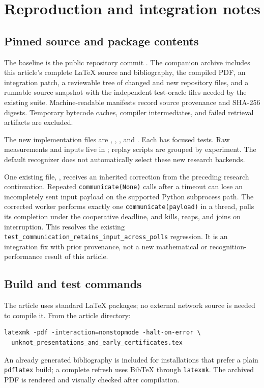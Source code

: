 \section{Reproduction and integration notes}
\label{sec:reproduce}

\subsection{Pinned source and package contents}

The baseline is the public repository commit \basecommit. The companion
archive includes this article's complete \LaTeX{} source and bibliography,
the compiled PDF, an integration patch, a reviewable tree of changed and
new repository files, and a runnable source snapshot with the independent
test-oracle files needed by the existing suite. Machine-readable manifests
record source provenance and SHA-256 digests. Temporary bytecode caches,
compiler intermediates, and failed retrieval artifacts are excluded.

The new implementation files are
, ,
, and
. Each has focused tests.
Raw measurements and inputs live in ; replay
scripts are grouped by experiment. The default recognizer does not
automatically select these new research backends.

One existing file, , receives an
inherited correction from the preceding research continuation. Repeated
\texttt{communicate(None)} calls after a timeout can lose an incompletely
sent input payload on the supported Python subprocess path. The corrected
worker performs exactly one \texttt{communicate(payload)} in a thread,
polls its completion under the cooperative deadline, and kills, reaps,
and joins on interruption. This resolves the existing
\texttt{test\_communication\_retains\_input\_across\_polls} regression.
It is an integration fix with prior provenance, not a new mathematical
or recognition-performance result of this article.

\subsection{Build and test commands}

The article uses standard \LaTeX{} packages; no external network source
is needed to compile it. From the article directory:
\par\noindent\begin{minipage}{\linewidth}
\begin{lstlisting}
latexmk -pdf -interaction=nonstopmode -halt-on-error \
  unknot_presentations_and_early_certificates.tex
\end{lstlisting}
\end{minipage}\par
An already generated bibliography is included for installations that
prefer a plain \texttt{pdflatex} build; a complete refresh uses BibTeX
through \texttt{latexmk}. The archived PDF is rendered and visually
checked after compilation.

